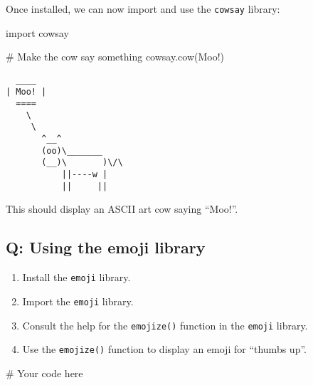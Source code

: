\documentclass[
  letterpaper,
  DIV=11,
  numbers=noendperiod]{scrreprt}
\newenvironment{Shaded}{\begin{snugshade}}{\end{snugshade}}
\newcommand{\CommentTok}[1]{\textcolor[rgb]{0.37,0.37,0.37}{#1}}
\newcommand{\ImportTok}[1]{\textcolor[rgb]{0.00,0.46,0.62}{#1}}
\newcommand{\NormalTok}[1]{\textcolor[rgb]{0.00,0.23,0.31}{#1}}
\newcommand{\StringTok}[1]{\textcolor[rgb]{0.13,0.47,0.30}{#1}}
\providecommand{\tightlist}{%
  \setlength{\itemsep}{0pt}\setlength{\parskip}{0pt}}\usepackage{longtable,booktabs,array}
\begin{document}
Once installed, we can now import and use the \texttt{cowsay} library:

\begin{Shaded}
\begin{Highlighting}[]
\ImportTok{import}\NormalTok{ cowsay}

\CommentTok{\# Make the cow say something}
\NormalTok{cowsay.cow(}\StringTok{\textquotesingle{}Moo!\textquotesingle{}}\NormalTok{)}
\end{Highlighting}
\end{Shaded}

\begin{verbatim}
  ____
| Moo! |
  ====
    \
     \
       ^__^
       (oo)\_______
       (__)\       )\/\
           ||----w |
           ||     ||
\end{verbatim}

This should display an ASCII art cow saying ``Moo!''.

\begin{tcolorbox}[enhanced jigsaw, colframe=quarto-callout-tip-color-frame, opacityback=0, titlerule=0mm, bottomrule=.15mm, breakable, leftrule=.75mm, colbacktitle=quarto-callout-tip-color!10!white, title=\textcolor{quarto-callout-tip-color}{\faLightbulb}\hspace{0.5em}{Practice}, rightrule=.15mm, coltitle=black, opacitybacktitle=0.6, colback=white, left=2mm, arc=.35mm, toptitle=1mm, bottomtitle=1mm, toprule=.15mm]

\subsection{Q: Using the emoji library}\label{q-using-the-emoji-library}

\begin{enumerate}
\def\labelenumi{\arabic{enumi}.}
\tightlist
\item
  Install the \texttt{emoji} library.
\item
  Import the \texttt{emoji} library.
\item
  Consult the help for the \texttt{emojize()} function in the
  \texttt{emoji} library.
\item
  Use the \texttt{emojize()} function to display an emoji for ``thumbs
  up''.
\end{enumerate}

\begin{Shaded}
\begin{Highlighting}[]
\CommentTok{\# Your code here}
\end{Highlighting}
\end{Shaded}

\end{tcolorbox}
\end{document}
